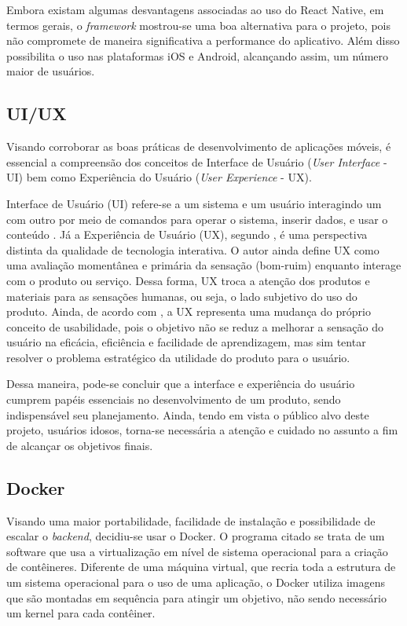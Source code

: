 Embora existam algumas desvantagens associadas ao uso do React Native, em termos gerais, o \textit{framework} mostrou-se uma boa alternativa para o projeto, pois não compromete de maneira significativa a performance do aplicativo. Além disso possibilita o uso nas plataformas iOS e Android, alcançando assim, um número maior de usuários.

\subsection{UI/UX}
Visando corroborar as boas práticas de desenvolvimento de aplicações móveis, é essencial a compreensão dos conceitos de Interface de Usuário (\textit{User Interface} - UI) bem como Experiência do Usuário (\textit{User Experience} - UX). %

Interface de Usuário (UI) refere-se a um sistema e um usuário interagindo um com outro por meio de comandos para operar o sistema, inserir dados, e usar o conteúdo \citep{joo2015}. Já a Experiência de Usuário (UX), segundo \cite{marc2008}, é uma perspectiva distinta da qualidade de tecnologia interativa. O autor ainda define UX como uma avaliação momentânea e primária da sensação (bom-ruim) enquanto interage com o produto ou serviço. Dessa forma, UX troca a atenção dos produtos e materiais para as sensações humanas, ou seja, o lado subjetivo do uso do produto. Ainda, de acordo com \cite{castilla2017}, a UX representa uma mudança do próprio conceito de usabilidade, pois o objetivo não se reduz a melhorar a sensação do usuário na eficácia, eficiência e facilidade de aprendizagem, mas sim tentar resolver o problema estratégico da utilidade do produto para o usuário. 

Dessa maneira, pode-se concluir que a interface e experiência do usuário cumprem papéis essenciais no desenvolvimento de um produto, sendo indispensável seu planejamento. Ainda, tendo em vista o público alvo deste projeto, usuários idosos, torna-se necessária a atenção e cuidado no assunto a fim de alcançar os objetivos finais.

\subsection{Docker}
Visando uma maior portabilidade, facilidade de instalação e possibilidade de escalar o \textit{backend}, decidiu-se usar o Docker.
O programa citado se trata de um software que usa a virtualização em nível de sistema operacional para a criação de contêineres. Diferente de uma máquina virtual, que recria toda a estrutura de um sistema operacional para o uso de uma aplicação, o Docker utiliza imagens que são montadas em sequência para atingir um objetivo, não sendo necessário um kernel para cada contêiner.

